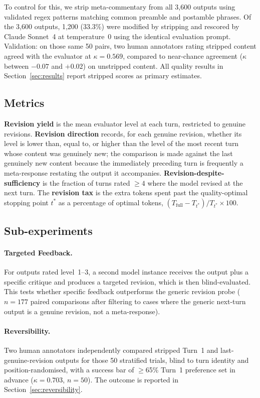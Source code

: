 To control for this, we strip meta-commentary from all 3,600 outputs using validated regex patterns matching common preamble and postamble phrases. Of the 3,600 outputs, 1,200 (33.3\%) were modified by stripping and rescored by Claude Sonnet~4 at temperature~0 using the identical evaluation prompt. Validation: on those same 50 pairs, two human annotators rating stripped content agreed with the evaluator at $\kappa = 0.569$, compared to near-chance agreement ($\kappa$ between $-0.07$ and $+0.02$) on unstripped content. All quality results in Section~\ref{sec:results} report stripped scores as primary estimates.

\subsection{Metrics}

\textbf{Revision yield} is the mean evaluator level at each turn, restricted to genuine
revisions. \textbf{Revision direction} records, for each genuine revision, whether its level
is lower than, equal to, or higher than the level of the most recent turn whose content was
genuinely new; the comparison is made against the last genuinely new content because the
immediately preceding turn is frequently a meta-response restating the output it
accompanies. \textbf{Revision-despite-sufficiency} is the fraction of turns rated
$\geq 4$ where the model revised at the next turn. The \textbf{revision tax} is the extra
tokens spent past the quality-optimal stopping point $t^*$ as a percentage of optimal tokens,
$(T_{\text{full}} - T_{t^*}) / T_{t^*} \times 100$.

\subsection{Sub-experiments}

\paragraph{Targeted Feedback.} For outputs rated level~1--3, a second model instance receives the output plus a specific critique and produces a targeted revision, which is then blind-evaluated. This tests whether specific feedback outperforms the generic revision probe ($n = 177$ paired comparisons after filtering to cases where the generic next-turn output is a genuine revision, not a meta-response).

\paragraph{Reversibility.} Two human annotators independently compared stripped Turn~1 and last-genuine-revision outputs for those 50 stratified trials, blind to turn identity and
position-randomised, with a success bar of $\geq$65\% Turn~1 preference set in advance
($\kappa = 0.703$, $n = 50$). The outcome is reported in Section~\ref{sec:reversibility}.


